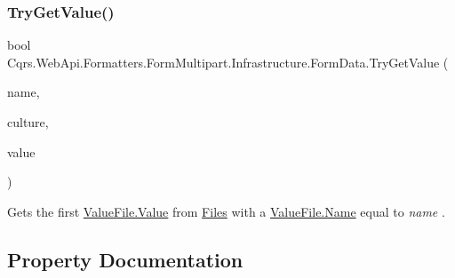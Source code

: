 \mbox{\label{classCqrs_1_1WebApi_1_1Formatters_1_1FormMultipart_1_1Infrastructure_1_1FormData_a0e75225cc7dc6292c4288924bcb23f62_a0e75225cc7dc6292c4288924bcb23f62}} 
\subsubsection{\texorpdfstring{Try\+Get\+Value()}{TryGetValue()}\hspace{0.1cm}{\footnotesize\ttfamily [2/2]}}
{\footnotesize\ttfamily bool Cqrs.\+Web\+Api.\+Formatters.\+Form\+Multipart.\+Infrastructure.\+Form\+Data.\+Try\+Get\+Value (\begin{DoxyParamCaption}\item[{string}]{name,  }\item[{Culture\+Info}]{culture,  }\item[{out \hyperlink{classCqrs_1_1WebApi_1_1Formatters_1_1FormMultipart_1_1Infrastructure_1_1HttpFile}{Http\+File}}]{value }\end{DoxyParamCaption})}



Get\textquotesingle{}s the first \hyperlink{classCqrs_1_1WebApi_1_1Formatters_1_1FormMultipart_1_1Infrastructure_1_1FormData_1_1ValueFile_aebbbefbeda7233acb846f54aaa2f26c2_aebbbefbeda7233acb846f54aaa2f26c2}{Value\+File.\+Value} from \hyperlink{classCqrs_1_1WebApi_1_1Formatters_1_1FormMultipart_1_1Infrastructure_1_1FormData_a09da7b76f703fc20899051d9d9ed17b0_a09da7b76f703fc20899051d9d9ed17b0}{Files} with a \hyperlink{classCqrs_1_1WebApi_1_1Formatters_1_1FormMultipart_1_1Infrastructure_1_1FormData_1_1ValueFile_a2410547f01c8ae8c6d5dd70d3f92284c_a2410547f01c8ae8c6d5dd70d3f92284c}{Value\+File.\+Name} equal to {\itshape name} . 



\subsection{Property Documentation}
\mbox{\label{classCqrs_1_1WebApi_1_1Formatters_1_1FormMultipart_1_1Infrastructure_1_1FormData_a91cfdcbb3a074aadee7e7fc228c04a6a_a91cfdcbb3a074aadee7e7fc228c04a6a}} 
